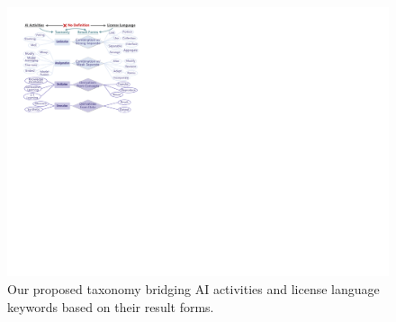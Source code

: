 \begin{figure}[t]
    \centering
    \includegraphics[width=\linewidth]{fig/taxonomy.pdf}
    \caption{Our proposed taxonomy bridging AI activities and license language keywords based on their result forms.}
    \Description{}
    \label{fig:tax}
\end{figure}


